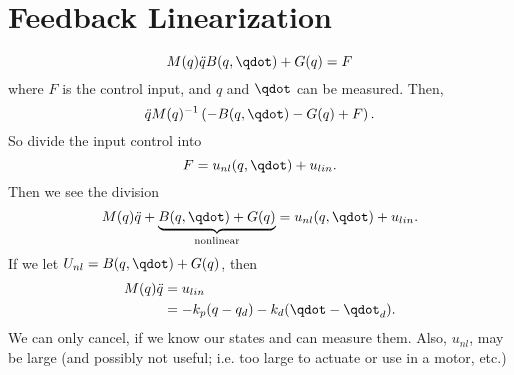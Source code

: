 \documentclass[10pt]{article}
\begin{document}
\section{Feedback Linearization}
\begin{equation}
  M(q)\ddot{q}B(q,\qdot) + G(q) = F
\end{equation}
where $F$ is the control input, and $q$ and $\qdot$ can be measured.
Then, 
\begin{equation}
  \ddot{q}M(q)^{-1} \left(- B(q,\qdot) - G(q) + F\right).
\end{equation}
So divide the input control into
\begin{equation}
  F = u_{nl}(q,\qdot) + u_{lin}.
\end{equation}
Then we see the division
\begin{equation}
  M(q)\ddot{q} + \underbrace{B(q,\qdot) + G(q)}_{\text{nonlinear}} =
  u_{nl}(q,\qdot) + u_{lin}. 
\end{equation}
If we let $U_{nl} = B(q,\qdot) +G(q)$, then 
\begin{equation}
\begin{split}
  M(q)\ddot{q}& = u_{lin} \\
  & = -k_p(q-q_d) - k_d(\qdot - \qdot_d).
\end{split}
\end{equation}
We can only cancel, if we know our states and can measure them.
Also, $u_{nl}$, may be large (and possibly not useful; i.e. too large
to actuate or use in a motor, etc.)
\end{document}
